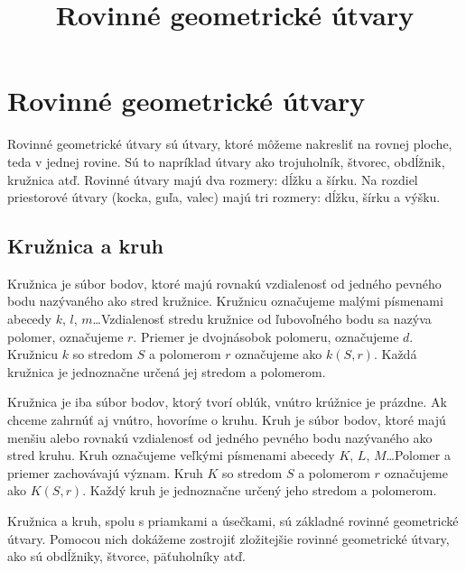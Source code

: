 \documentclass{article}
\title{Rovinné geometrické útvary}
\begin{document}
\maketitle

\section{Rovinné geometrické útvary}

Rovinné geometrické útvary sú útvary, ktoré môžeme nakresliť na rovnej ploche, teda v jednej rovine. Sú to napríklad útvary ako trojuholník, štvorec, obdĺžnik, kružnica atď. Rovinné útvary majú dva rozmery: dĺžku a šírku. Na rozdiel priestorové útvary (kocka, guľa, valec) majú tri rozmery: dĺžku, šírku a výšku.

\subsection{Kružnica a kruh}

Kružnica je súbor bodov, ktoré majú rovnakú vzdialenosť od jedného pevného bodu nazývaného ako stred kružnice. Kružnicu označujeme malými písmenami abecedy \(k\), \(l\), \(m\)\dots Vzdialenosť stredu kružnice od ľubovoľného bodu sa nazýva polomer, označujeme \(r\). Priemer je dvojnásobok polomeru, označujeme \(d\). Kružnicu \(k\) so stredom \(S\) a polomerom \(r\) označujeme ako \(k(S, r)\). Každá kružnica je jednoznačne určená jej stredom a polomerom.

Kružnica je iba súbor bodov, ktorý tvorí oblúk, vnútro krúžnice je prázdne. Ak chceme zahrnúť aj vnútro, hovoríme o kruhu. Kruh je súbor bodov, ktoré majú menšiu alebo rovnakú vzdialenosť od jedného pevného bodu nazývaného ako stred kruhu. Kruh označujeme veľkými písmenami abecedy \(K\), \(L\), \(M\)\dots Polomer a priemer zachovávajú význam. Kruh \(K\) so stredom \(S\) a polomerom \(r\) označujeme ako \(K(S, r)\). Každý kruh je jednoznačne určený jeho stredom a polomerom.

Kružnica a kruh, spolu s priamkami a úsečkami, sú základné rovinné geometrické útvary. Pomocou nich dokážeme zostrojiť zložitejšie rovinné geometrické útvary, ako sú obdĺžniky, štvorce, päťuholníky atď.
\end{document}
